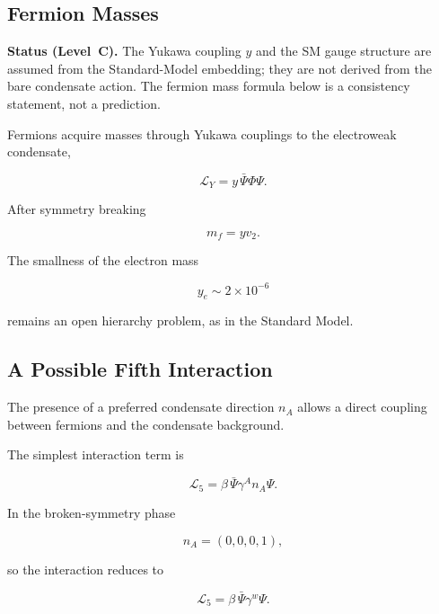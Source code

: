 \documentclass[11pt,a4paper]{article}
\numberwithin{equation}{section}
\begin{document}
\subsection{Fermion Masses}

\textbf{Status (Level~C).}  The Yukawa coupling $y$ and the SM gauge
structure are assumed from the Standard-Model embedding; they are not
derived from the bare condensate action.  The fermion mass formula below
is a consistency statement, not a prediction.

Fermions acquire masses through Yukawa couplings to the electroweak
condensate,

\begin{equation}
\mathcal{L}_{Y}
=
y\,\bar{\Psi}\Phi\Psi .
\end{equation}

After symmetry breaking

\begin{equation}
m_f = y v_2 .
\end{equation}

The smallness of the electron mass

\begin{equation}
y_e \sim 2\times10^{-6}
\end{equation}

remains an open hierarchy problem, as in the Standard Model.

\subsection{A Possible Fifth Interaction}

The presence of a preferred condensate direction $n_A$ allows a
direct coupling between fermions and the condensate background.

The simplest interaction term is

\begin{equation}
\mathcal{L}_5
=
\beta \,
\bar{\Psi}\gamma^A n_A \Psi .
\end{equation}

In the broken-symmetry phase

\begin{equation}
n_A=(0,0,0,1),
\end{equation}

so the interaction reduces to

\begin{equation}
\mathcal{L}_5
=
\beta\,
\bar{\Psi}\gamma^w \Psi .
\end{equation}
\end{document}
